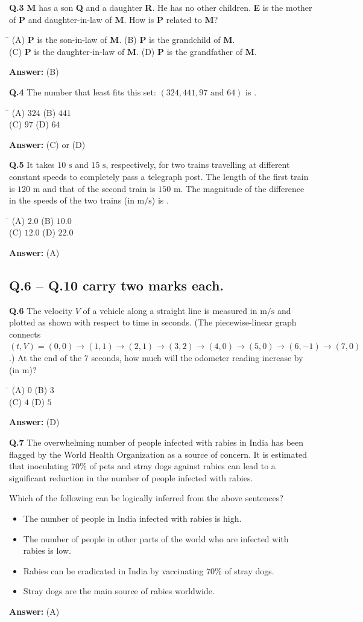 \documentclass[11pt,a4paper]{article}
\newcommand{\optsfourA}[4]{%
  \begin{tabbing}
    \hspace{0.48\linewidth}\=\kill
    (A) #1 \> (B) #2 \\[2pt]
    (C) #3 \> (D) #4
  \end{tabbing}%
}
\newcommand{\optslistA}[4]{%
  \begin{itemize}
    \setlength{\itemsep}{2pt}\setlength{\parskip}{0pt}
    \item[(A)] #1
    \item[(B)] #2
    \item[(C)] #3
    \item[(D)] #4
  \end{itemize}%
}
\newcommand{\ans}[1]{\textbf{Answer:} #1\par\medskip}
\begin{document}
\textbf{Q.3} \textbf{M} has a son \textbf{Q} and a daughter \textbf{R}. He has no other children. \textbf{E} is the mother of \textbf{P} and daughter-in-law of \textbf{M}. How is \textbf{P} related to \textbf{M}?
\optsfourA{\textbf{P} is the son-in-law of \textbf{M}.}{\textbf{P} is the grandchild of \textbf{M}.}{\textbf{P} is the daughter-in-law of \textbf{M}.}{\textbf{P} is the grandfather of \textbf{M}.}
\ans{(B)}

\textbf{Q.4} The number that least fits this set: $(324, 441, 97 \text{ and } 64)$ is \underline{\hspace{2cm}}.
\optsfourA{$324$}{$441$}{$97$}{$64$}
\ans{(C) or (D)}

\textbf{Q.5} It takes $10\text{ s}$ and $15\text{ s}$, respectively, for two trains travelling at different constant speeds to completely pass a telegraph post. The length of the first train is $120\text{ m}$ and that of the second train is $150\text{ m}$. The magnitude of the difference in the speeds of the two trains (in $\text{m/s}$) is \underline{\hspace{2cm}}.
\optsfourA{$2.0$}{$10.0$}{$12.0$}{$22.0$}
\ans{(A)}

\subsection*{Q.6 -- Q.10 carry two marks each.}

\textbf{Q.6} The velocity $V$ of a vehicle along a straight line is measured in $\text{m/s}$ and plotted as shown with respect to time in seconds. (The piecewise-linear graph connects $(t, V) = (0,0) \to (1,1) \to (2,1) \to (3,2) \to (4,0) \to (5,0) \to (6,-1) \to (7,0)$.) At the end of the $7$ seconds, how much will the odometer reading increase by (in $\text{m}$)?
\optsfourA{$0$}{$3$}{$4$}{$5$}
\ans{(D)}

\textbf{Q.7} The overwhelming number of people infected with rabies in India has been flagged by the World Health Organization as a source of concern. It is estimated that inoculating $70\%$ of pets and stray dogs against rabies can lead to a significant reduction in the number of people infected with rabies.

Which of the following can be logically inferred from the above sentences?
\optslistA{The number of people in India infected with rabies is high.}{The number of people in other parts of the world who are infected with rabies is low.}{Rabies can be eradicated in India by vaccinating $70\%$ of stray dogs.}{Stray dogs are the main source of rabies worldwide.}
\ans{(A)}
\end{document}
